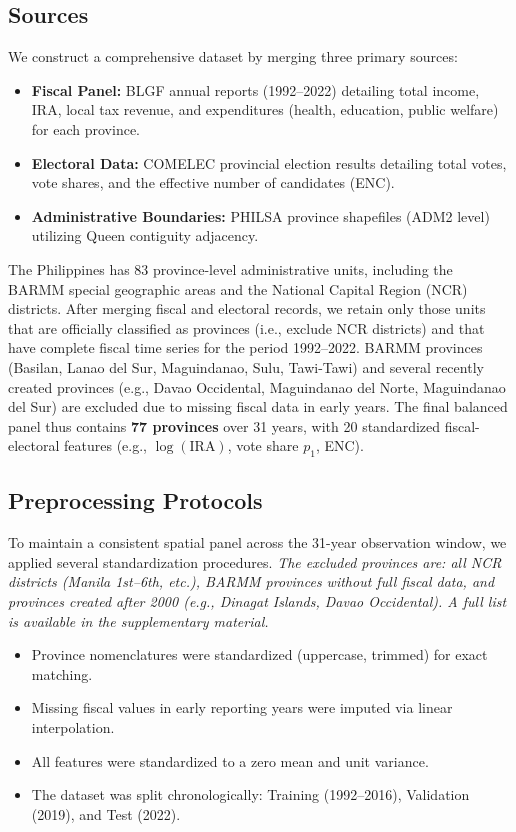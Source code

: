 \documentclass[conference]{IEEEtran}
\begin{document}
\subsection{Sources}
We construct a comprehensive dataset by merging three primary sources:
\begin{itemize}
\item \textbf{Fiscal Panel:} BLGF annual reports (1992--2022) detailing total income, IRA, local tax revenue, and expenditures (health, education, public welfare) for each province.
\item \textbf{Electoral Data:} COMELEC provincial election results detailing total votes, vote shares, and the effective number of candidates (ENC).
\item \textbf{Administrative Boundaries:} PHILSA province shapefiles (ADM2 level) utilizing Queen contiguity adjacency.
\end{itemize}
The Philippines has 83 province-level administrative units, including the BARMM special geographic areas and the National Capital Region (NCR) districts. After merging fiscal and electoral records, we retain only those units that are officially classified as provinces (i.e., exclude NCR districts) and that have complete fiscal time series for the period 1992--2022. BARMM provinces (Basilan, Lanao del Sur, Maguindanao, Sulu, Tawi-Tawi) and several recently created provinces (e.g., Davao Occidental, Maguindanao del Norte, Maguindanao del Sur) are excluded due to missing fiscal data in early years. The final balanced panel thus contains \textbf{77 provinces} over 31 years, with 20 standardized fiscal-electoral features (e.g., $\log(\text{IRA})$, vote share $p_1$, ENC).

\subsection{Preprocessing Protocols}
To maintain a consistent spatial panel across the 31-year observation window, we applied several standardization procedures. \textit{The excluded provinces are: all NCR districts (Manila 1st--6th, etc.), BARMM provinces without full fiscal data, and provinces created after 2000 (e.g., Dinagat Islands, Davao Occidental). A full list is available in the supplementary material.}
\begin{itemize}
\item Province nomenclatures were standardized (uppercase, trimmed) for exact matching.
\item Missing fiscal values in early reporting years were imputed via linear interpolation.
\item All features were standardized to a zero mean and unit variance.
\item The dataset was split chronologically: Training (1992--2016), Validation (2019), and Test (2022).
\end{itemize}
\end{document}
